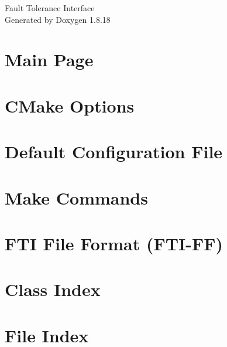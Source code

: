 \let\mypdfximage\pdfximage\def\pdfximage{\immediate\mypdfximage}\documentclass[twoside]{book}
\newcommand{\+}{\discretionary{\mbox{\scriptsize$\hookleftarrow$}}{}{}}
\newcommand{\clearemptydoublepage}{%
  \newpage{\pagestyle{empty}\cleardoublepage}%
}
\begin{document}
\hypersetup{pageanchor=false,
             bookmarksnumbered=true,
             pdfencoding=unicode
            }
\begin{titlepage}
\vspace*{7cm}
\begin{center}%
{\Large Fault Tolerance Interface }\\
\vspace*{1cm}
{\large Generated by Doxygen 1.8.18}\\
\end{center}
\end{titlepage}
\clearemptydoublepage
{}
\tableofcontents
\clearemptydoublepage
{}
\hypersetup{pageanchor=true}

\chapter{Main Page}
\label{index}\hypertarget{index}{}
\chapter{C\+Make Options}
\label{md_cmake}

\chapter{Default Configuration File}
\label{md_config}

\chapter{Make Commands}
\label{md_make}

\chapter{F\+TI File Format (F\+T\+I-\/\+FF)}
\label{md_ftiff}

\chapter{Class Index}

\chapter{File Index}

\end{document}
